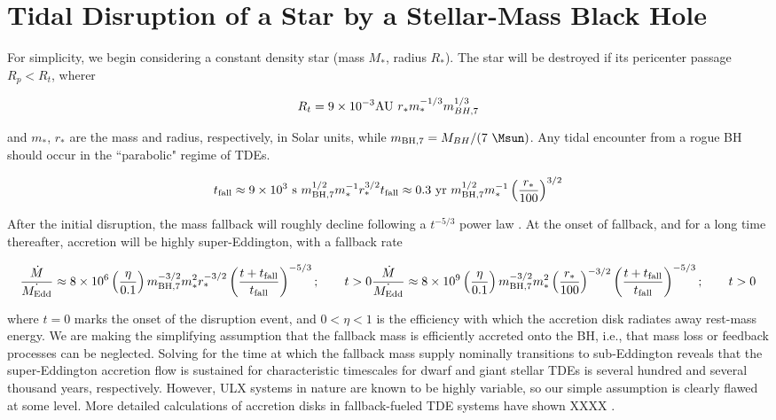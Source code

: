 \section{Tidal Disruption of a Star by a Stellar-Mass Black Hole}\label{section:general}


For simplicity, we begin considering a constant density star (mass $M_*$, radius $R_*$).  The star will be destroyed if its pericenter passage $R_p < R_t$, wherer

\begin{equation}
R_t = 9 \times 10^{-3} {\rm AU}~ r_{*} m_{*}^{-1/3} m_{BH,7}^{1/3}
\end{equation}

and $m_*$, $r_*$ are the mass and radius, respectively, in Solar units, while $m_{{\rm BH},7} = M_{BH}/(7~\Msun)$.  Any tidal encounter from a rogue BH should occur in the ``parabolic" regime of TDEs.   

\begin{equation}
t_{\rm fall} \approx 9 \times 10^3~{\rm s}~m_{{\rm BH},7}^{1/2}m_{*}^{-1}r_{*}^{3/2}\\
t_{\rm fall} \approx 0.3~{\rm yr}~m_{{\rm BH},7}^{1/2}m_{*}^{-1}\left(\frac{r_{*}}{100}\right)^{3/2}
\end{equation}

After the initial disruption, the mass fallback will roughly decline following a $t^{-5/3}$ power law \citep{Rees_1988}. At the onset of fallback, and for a long time thereafter, accretion will be highly super-Eddington, with a fallback rate

\begin{equation}
\frac{\dot{M}}{\dot{M_{\rm Edd}}} \approx 8 \times 10^{6} \left(\frac{\eta}{0.1}\right)m_{\rm BH,7}^{-3/2}m_{*}^{2}r_*^{-3/2} \left(\frac{t+t_{\rm fall}}{t_{\rm fall}}\right)^{-5/3}; \qquad t > 0 \\
\frac{\dot{M}}{\dot{M_{\rm Edd}}} \approx 8 \times 10^{9} \left(\frac{\eta}{0.1}\right)m_{\rm BH,7}^{-3/2}m_{*}^{2}\left(\frac{r_*}{100}\right)^{-3/2} \left(\frac{t+t_{\rm fall}}{t_{\rm fall}}\right)^{-5/3}; \qquad t > 0
\end{equation}

where $t=0$ marks the onset of the disruption event, and $0 < \eta < 1$ is the efficiency with which the accretion disk radiates away rest-mass energy.  We are making the simplifying assumption that the fallback mass is efficiently accreted onto the BH, i.e., that mass loss or feedback processes can be neglected.  Solving for the time at which the fallback mass supply nominally transitions to sub-Eddington reveals that the super-Eddington accretion flow is sustained for characteristic timescales for dwarf and giant stellar TDEs is several hundred and several thousand years, respectively.  
However, ULX systems in nature are known to be highly variable, so our simple assumption is clearly flawed at some level.   More detailed calculations of accretion disks in fallback-fueled TDE systems have shown XXXX \citep{Shen_2014,Coughlin_2014}.   

